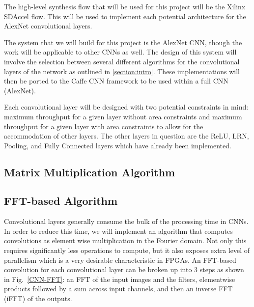 \documentclass[conference,compsoc]{IEEEtran/IEEEtran}
\begin{document}
The high-level synthesis flow that will be used for this project will be the Xilinx 
SDAccel flow. This will be used to implement each potential architecture for the 
AlexNet convolutional layers. 

The system that we will build for this project is the AlexNet CNN, though the work 
will be applicable to other CNNs as well. The design of this system will involve the 
selection between several different algorithms for the convolutional layers of the 
network as outlined in \ref{section:intro}. These implementations will then be ported
to the Caffe CNN framework to be used within a full CNN (AlexNet). 

Each convolutional layer will be designed with two potential constraints in mind: 
maximum throughput for a given layer without area constraints and maximum throughput
for a given layer with area constraints to allow for the accommodation of other 
layers. The other layers in question are the ReLU, LRN, Pooling, and Fully Connected
layers which have already been implemented. 


\subsection{Matrix Multiplication Algorithm}


\subsection{FFT-based Algorithm}
Convolutional layers generally consume the bulk of the processing time in CNNs. In order to reduce this time, we will implement an algorithm that computes convolutions as element wise multiplication in the Fourier domain. Not only this requires significantly less operations to compute, but it also exposes extra level of parallelism which is a very desirable characteristic in FPGAs. An FFT-based convolution for each convolutional layer can be broken up into $3$ steps as shown in Fig.~\ref{CNN-FFT}: an FFT of the input images and the filters, elementwise products followed by a sum across input channels, and then an inverse FFT (iFFT) of the outputs.
\end{document}
